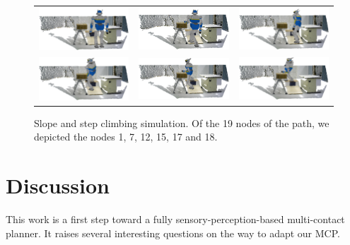 \begin{figure}[!htb]
	\centering
	\renewcommand{\arraystretch}{0.2}
	\begin{tabular}{l c r}
		\includegraphics[width=.308\linewidth]{papers/RAM2013/pictures/Simu9Step0.png}&
		\includegraphics[width=.308\linewidth]{papers/RAM2013/pictures/Simu9Step6.png}&
		\includegraphics[width=.308\linewidth]{papers/RAM2013/pictures/Simu9Step11.png}\\
		\includegraphics[width=.308\linewidth]{papers/RAM2013/pictures/Simu9Step14.png}&
		\includegraphics[width=.308\linewidth]{papers/RAM2013/pictures/Simu9Step16.png}&
		\includegraphics[width=.308\linewidth]{papers/RAM2013/pictures/Simu9Step17.png}\\
	\end{tabular}
	\caption{Slope and step climbing simulation. Of the 19 nodes of the path, we depicted the nodes 1, 7, 12, 15, 17 and 18.}
	\label{fig:crapahut-simulation}	
\end{figure}


\section{Discussion}
This work is a first step toward a fully sensory-perception-based multi-contact planner. It raises several interesting questions on the way to adapt our MCP. 

